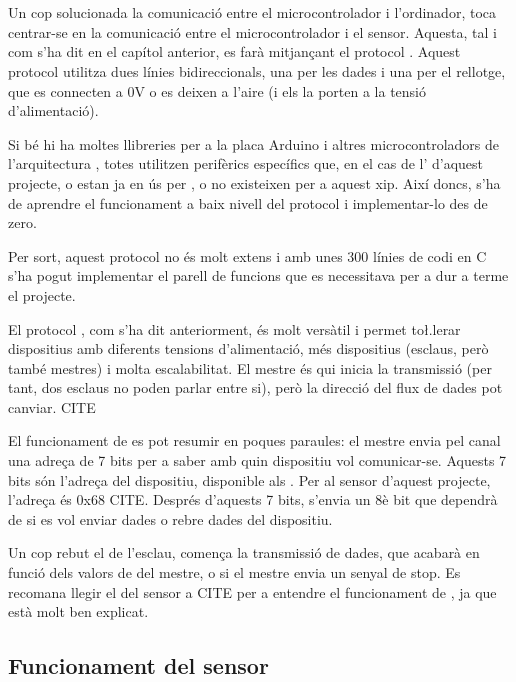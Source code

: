 \section{}

Un cop solucionada la comunicació entre el microcontrolador i l'ordinador, toca
centrar-se en la comunicació entre el microcontrolador i el sensor. Aquesta, tal
i com s'ha dit en el capítol anterior, es farà mitjançant el protocol .
Aquest protocol utilitza dues línies bidireccionals, una per les dades i una per
el rellotge, que es connecten a 0V o es deixen a l'aire (i els  la
porten a la tensió d'alimentació).

Si bé hi ha moltes llibreries per a la placa Arduino i altres microcontroladors
de l'arquitectura , totes utilitzen perifèrics específics que, en el
cas de l' d'aquest projecte, o estan ja en ús per , o
no existeixen per a aquest xip. Així doncs, s'ha de aprendre el funcionament a
baix nivell del protocol i implementar-lo des de zero.

Per sort, aquest protocol no és molt extens i amb unes 300 línies de codi en C
s'ha pogut implementar el parell de funcions que es necessitava per a dur a
terme el projecte.

El protocol , com s'ha dit anteriorment, és molt versàtil i permet 
to\l.lerar dispositius amb diferents tensions d'alimentació, més dispositius
(esclaus, però també mestres) i molta escalabilitat. El mestre és qui inicia
la transmissió (per tant, dos esclaus no poden parlar entre si), però la
direcció del flux de dades pot canviar. CITE

El funcionament de  es pot resumir en poques paraules: el mestre envia
pel canal una adreça de 7 bits per a saber amb quin dispositiu vol comunicar-se.
Aquests 7 bits són l'adreça del dispositiu, disponible als . Per
al sensor d'aquest projecte, l'adreça és 0x68 CITE. Després d'aquests 7 bits,
s'envia un 8è bit que dependrà de si es vol enviar dades o rebre dades del
dispositiu.

Un cop rebut el  de l'esclau, comença la transmissió de
dades, que acabarà en funció dels valors de  del mestre, o
si el mestre envia un senyal de stop. Es recomana llegir el  del
sensor a CITE per a entendre el funcionament de , ja que està molt ben
explicat.

\subsection{Funcionament del sensor }

